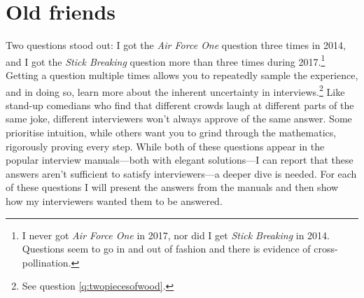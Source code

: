 \documentclass[a4paper]{article}
\begin{document}
\section{Old friends}
Two questions stood out:
I got the \emph{Air Force One} question three times in 2014, and I got the \emph{Stick Breaking} question more than three times during 2017.\footnote{I never got \emph{Air Force One} in 2017, nor did I get \emph{Stick Breaking} in 2014. Questions seem to go in and out of fashion and there is evidence of cross-pollination.}
Getting a question multiple times allows you to repeatedly sample the experience, and in doing so, learn more about the inherent uncertainty in interviews.\footnote{See question \ref{q:twopiecesofwood}.}
Like stand-up comedians who find that different crowds laugh at different parts of the same joke, different interviewers won't always approve of the same answer.
Some prioritise intuition, while others want you to grind through the mathematics, rigorously proving every step.
While both of these questions appear in the popular interview manuals---both with elegant solutions---I can report that these answers aren't sufficient to satisfy interviewers---a deeper dive is needed.
For each of these questions I will present the answers from the manuals and then show how my interviewers wanted them to be answered.
\end{document}
